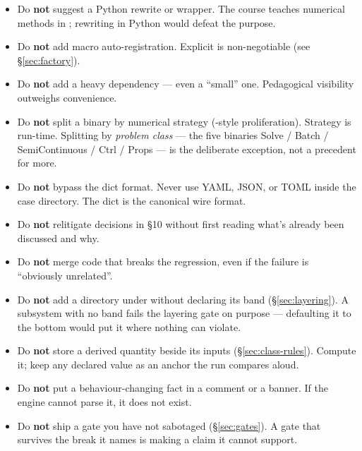\documentclass[11pt,a4paper]{article}
\begin{document}
\begin{itemize}[leftmargin=*]
  \item Do \textbf{not} suggest a Python rewrite or wrapper. The course
        teaches numerical methods in \cpp{}; rewriting in Python would
        defeat the purpose.
  \item Do \textbf{not} add macro auto-registration. Explicit
         is non-negotiable (see \S\ref{sec:factory}).
  \item Do \textbf{not} add a heavy dependency --- even a ``small'' one.
        Pedagogical visibility outweighs convenience.
  \item Do \textbf{not} split a binary by numerical strategy
        (-style proliferation). Strategy is run-time. Splitting
        by \emph{problem class} --- the five binaries Solve / Batch /
        SemiContinuous / Ctrl / Props --- is the deliberate exception, not a
        precedent for more.
  \item Do \textbf{not} bypass the dict format. Never use YAML, JSON, or
        TOML inside the case directory. The dict is the canonical wire
        format.
  \item Do \textbf{not} relitigate decisions in  \S10
        without first reading what's already been discussed and why.
  \item Do \textbf{not} merge code that breaks the regression, even if
        the failure is ``obviously unrelated''.
  \item Do \textbf{not} add a directory under  without declaring
        its band (\S\ref{sec:layering}). A subsystem with no band fails the
        layering gate on purpose --- defaulting it to the bottom would put it
        where nothing can violate.
  \item Do \textbf{not} store a derived quantity beside its inputs
        (\S\ref{sec:class-rules}). Compute it; keep any declared value as an
        anchor the run compares aloud.
  \item Do \textbf{not} put a behaviour-changing fact in a comment or a
        banner. If the engine cannot parse it, it does not exist.
  \item Do \textbf{not} ship a gate you have not sabotaged
        (\S\ref{sec:gates}). A gate that survives the break it names is
        making a claim it cannot support.
\end{itemize}

\end{document}

